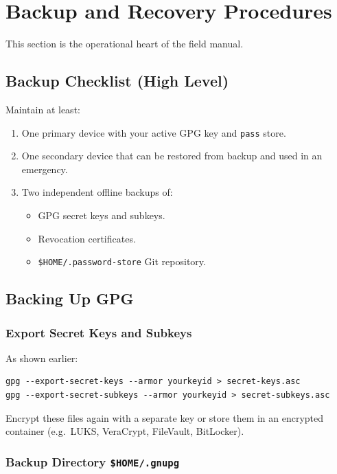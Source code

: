 \documentclass[11pt,a4paper]{article}
\newcommand{\file}[1]{\texttt{#1}}
\begin{document}
\section{Backup and Recovery Procedures}

This section is the operational heart of the field manual.

\subsection{Backup Checklist (High Level)}

Maintain at least:

\begin{enumerate}[noitemsep]
  \item One primary device with your active GPG key and \texttt{pass} store.
  \item One secondary device that can be restored from backup and used in an emergency.
  \item Two independent offline backups of:
    \begin{itemize}[noitemsep]
      \item GPG secret keys and subkeys.
      \item Revocation certificates.
      \item \file{\$HOME/.password-store} Git repository.
    \end{itemize}
\end{enumerate}

\subsection{Backing Up GPG}

\subsubsection{Export Secret Keys and Subkeys}

As shown earlier:

\begin{verbatim}
gpg --export-secret-keys --armor yourkeyid > secret-keys.asc
gpg --export-secret-subkeys --armor yourkeyid > secret-subkeys.asc
\end{verbatim}

Encrypt these files again with a separate key or store them in an encrypted container (e.g.\ LUKS, VeraCrypt, FileVault, BitLocker).

\subsubsection{Backup Directory \texttt{\$HOME/.gnupg}}
\end{document}
